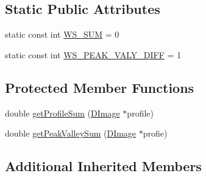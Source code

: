 \subsection*{Static Public Attributes}
\begin{DoxyCompactItemize}
\item 
static const int \hyperlink{class_projection_profile_a06bb71f5459acefbdac42a661a4c494e}{W\+S\+\_\+\+S\+U\+M} = 0
\item 
static const int \hyperlink{class_projection_profile_a89ec8c60c23f878f08e27b0271e94153}{W\+S\+\_\+\+P\+E\+A\+K\+\_\+\+V\+A\+L\+Y\+\_\+\+D\+I\+F\+F} = 1
\end{DoxyCompactItemize}
\subsection*{Protected Member Functions}
\begin{DoxyCompactItemize}
\item 
double \hyperlink{class_projection_profile_a021b58fa03665d59cf6a21827a4c514c}{get\+Profile\+Sum} (\hyperlink{class_d_image}{D\+Image} $\ast$profile)
\item 
double \hyperlink{class_projection_profile_ae7f19afd842e2989b7642d4de8f7f334}{get\+Peak\+Valley\+Sum} (\hyperlink{class_d_image}{D\+Image} $\ast$profie)
\end{DoxyCompactItemize}
\subsection*{Additional Inherited Members}


